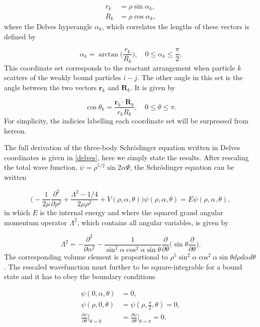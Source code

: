\documentclass{article}
\numberwithin{equation}{section}
\numberwithin{figure}{section}
\begin{document}
\begin{align}
	r_{k} &= \rho \sin{\alpha_{k}},\\
	R_{k} &= \rho \cos{\alpha_{k}},
\end{align}
where the Delves hyperangle $\alpha_{k}$, which correlates the lengths of these vectors is defined by

\begin{equation}
	\alpha_{k} = \arctan\bigg(\frac{r_{k}}{R_{k}}\bigg), \quad 0\leq \alpha_{k} \leq \frac{\pi}{2}.
\end{equation}
This coordinate set corresponds to the reactant arrangement when particle $k$ scatters of the weakly bound particles $i-j$. The other angle in this set is the angle between the two vectors $\mathbf{r}_{k}$ and $\mathbf{R}_{k}$. It is given by

\begin{equation}
\cos{\theta_{k}} = \frac{\mathbf{r}_{k} \cdot \mathbf{R}_{k}}{r_{k} R_{k}}, \quad  0\leq \theta \leq \pi.
\end{equation}
For simplicity, the indicies labelling each coordinate set will be surpressed from hereon. 

The full derivation of the three-body Schr{\"o}dinger equation written in Delves coordinates is given in \cref{delves}, here we simply state the results. After rescaling the total wave function, $\psi = \rho^{5/2}\sin2\alpha\Psi$, the Schr{\"o}dinger equation can be written

\begin{equation}
\bigg(-\frac{1}{2\mu}\frac{\partial^2}{\partial\rho^2} + \frac{\Lambda^2 - 1/4}{2\mu\rho^2} + V(\rho,\alpha,\theta)\bigg) \psi(\rho,\alpha,\theta) = E \psi(\rho,\alpha,\theta),
\end{equation}
in which $E$ is the internal energy and where the squared grand angular momentum operator $\Lambda^2$, which contains all angular variables, is given by

\begin{equation}
\Lambda^2 = -\frac{\partial^2}{\partial\alpha^2} - \frac{1}{\sin^2\alpha\cos^2\alpha\sin\theta} \frac{\partial}{\partial\theta} \bigg( \sin\theta \frac{\partial}{\partial\theta}\bigg).
\end{equation}
The corresponding volume element is proportional to $\rho^5\sin^2\alpha\cos^2\alpha\sin\theta d\rho d\alpha d\theta$. The rescaled wavefunction must further to be square-integrable for a bound state and it has to obey the boundary conditions

\begin{align}
\psi(0,\alpha,\theta) &= 0,\\
\psi(\rho,0,\theta)    &= \psi(\rho,\frac{\pi}{2},\theta) = 0,\\
\frac{\partial\psi}{\partial\theta}\bigg\rvert_{\theta = 0} &= \frac{\partial\psi}{\partial\theta}\bigg\rvert_{\theta = \pi} = 0.
\end{align} 
\end{document}
